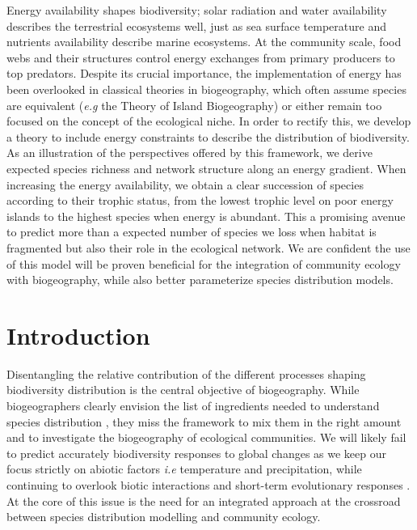 Energy availability shapes biodiversity; solar radiation and water
availability describes the terrestrial ecosystems well, just as sea
surface temperature and nutrients availability describe marine
ecosystems. At the community scale, food webs and their structures
control energy exchanges from primary producers to top predators.
Despite its crucial importance, the implementation of energy has been
overlooked in classical theories in biogeography, which often assume
species are equivalent (\emph{e.g} the Theory of Island Biogeography) or
either remain too focused on the concept of the ecological niche. In
order to rectify this, we develop a theory to include energy constraints
to describe the distribution of biodiversity. As an illustration of the
perspectives offered by this framework, we derive expected species
richness and network structure along an energy gradient. When increasing
the energy availability, we obtain a clear succession of species
according to their trophic status, from the lowest trophic level on poor
energy islands to the highest species when energy is abundant. This a
promising avenue to predict more than a expected number of species we
loss when habitat is fragmented but also their role in the ecological
network. We are confident the use of this model will be proven
beneficial for the integration of community ecology with biogeography,
while also better parameterize species distribution models.

\section{Introduction}\label{introduction}

Disentangling the relative contribution of the different processes
shaping biodiversity distribution is the central objective of
biogeography. While biogeographers clearly envision the list of
ingredients needed to understand species distribution
\citep{Thuiller2013}, they miss the framework to mix them in the right
amount and to investigate the biogeography of ecological communities. We
will likely fail to predict accurately biodiversity responses to global
changes as we keep our focus strictly on abiotic factors \emph{i.e}
temperature and precipitation, while continuing to overlook biotic
interactions \citep{Wiens2011} and short-term evolutionary responses
\citep{Lavergne2010}. At the core of this issue is the need for an
integrated approach at the crossroad between species distribution
modelling and community ecology.

